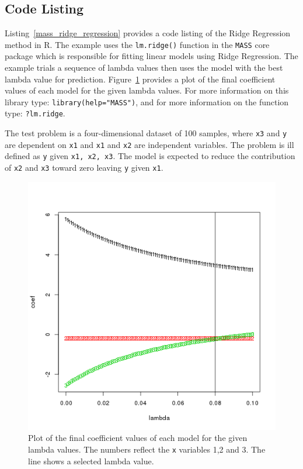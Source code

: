 \subsection{Code Listing}
Listing~\ref{mass_ridge_regression} provides a code listing of the Ridge Regression method in R.
The example uses the \texttt{lm.ridge()} function in the \texttt{MASS} core package which is responsible for fitting linear models using Ridge Regression. The example trials a sequence of lambda values then uses the model with the best lambda value for prediction. Figure~\ref{plot:ridge_regression_result} provides a plot of the final coefficient values of each model for the given lambda values. For more information on this library type: \texttt{library(help="MASS")}, and for more information on the function type: \texttt{?lm.ridge}.

The test problem is a four-dimensional dataset of 100 samples, where \texttt{x3} and \texttt{y} are dependent on \texttt{x1} and \texttt{x1} and \texttt{x2} are independent variables. The problem is ill defined as \texttt{y} given \texttt{x1, x2, x3}. The model is expected to reduce the contribution of \texttt{x2} and \texttt{x3} toward zero leaving \texttt{y} given \texttt{x1}.



\begin{figure}[htp]
\centering
\includegraphics[scale=0.70]{a_regularization/ridge_regression_result.png}
\caption{Plot of the final coefficient values of each model for the given lambda values. The numbers reflect the \texttt{x} variables 1,2 and 3. The line shows a selected lambda value.}
\label{plot:ridge_regression_result}
\end{figure}

